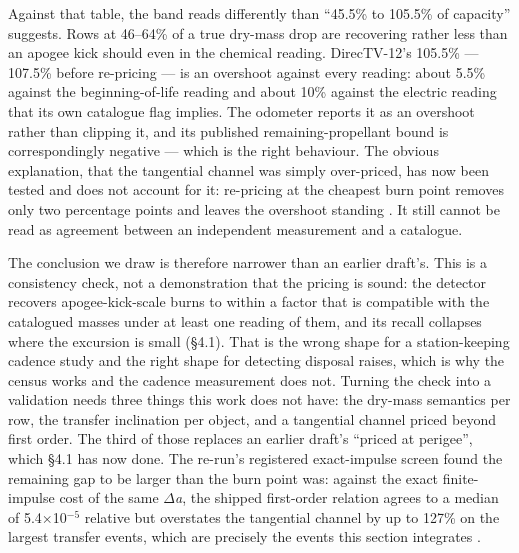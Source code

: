 \documentclass[11pt]{article}
\begin{document}
Against that table, the band reads differently than ``45.5\% to 105.5\% of capacity'' suggests. Rows at 46--64\% of a true dry-mass drop are recovering rather less than an apogee kick should even in the chemical reading. DirecTV-12's 105.5\% --- 107.5\% before re-pricing --- is an overshoot against every reading: about 5.5\% against the beginning-of-life reading and about 10\% against the electric reading that its own catalogue flag implies. The odometer reports it as an overshoot rather than clipping it, and its published remaining-propellant bound is correspondingly negative --- which is the right behaviour. The obvious explanation, that the tangential channel was simply over-priced, has now been tested and does not account for it: re-pricing at the cheapest burn point removes only two percentage points and leaves the overshoot standing%
. It still cannot be read as agreement between an independent measurement and a catalogue.

The conclusion we draw is therefore narrower than an earlier draft's. This is a consistency check, not a demonstration that the pricing is sound: the detector recovers apogee-kick-scale burns to within a factor that is compatible with the catalogued masses under at least one reading of them, and its recall collapses where the excursion is small (\S{}4.1). That is the wrong shape for a station-keeping cadence study and the right shape for detecting disposal raises, which is why the census works and the cadence measurement does not. Turning the check into a validation needs three things this work does not have: the dry-mass semantics per row, the transfer inclination per object, and a tangential channel priced beyond first order. The third of those replaces an earlier draft's ``priced at perigee'', which \S{}4.1 has now done. The re-run's registered exact-impulse screen found the remaining gap to be larger than the burn point was: against the exact finite-impulse cost of the same $\Delta$\emph{a}, the shipped first-order relation agrees to a median of 5.4$\times$10\ensuremath{^{-5}} relative but overstates the tangential channel by up to 127\% on the largest transfer events, which are precisely the events this section integrates%
.
\end{document}
